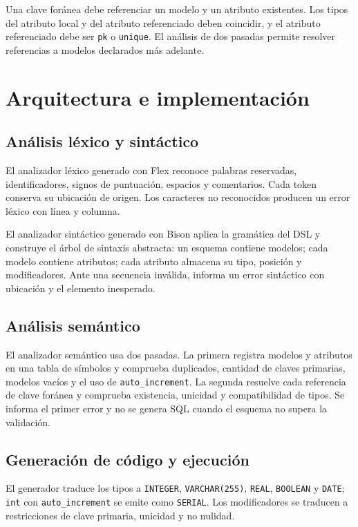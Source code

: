 \documentclass[runningheads]{llncs}
\begin{document}
Una clave foránea debe referenciar un modelo y un atributo existentes. Los tipos
del atributo local y del atributo referenciado deben coincidir, y el atributo
referenciado debe ser \texttt{pk} o \texttt{unique}. El análisis de dos pasadas
permite resolver referencias a modelos declarados más adelante.

\section{Arquitectura e implementación}

\subsection{Análisis léxico y sintáctico}

El analizador léxico generado con Flex reconoce palabras reservadas, identificadores, signos de
puntuación, espacios y comentarios. Cada token conserva su ubicación de origen.
Los caracteres no reconocidos producen un error léxico con línea y columna.

El analizador sintáctico generado con Bison aplica la gramática del DSL y
construye el árbol de sintaxis abstracta: un esquema contiene modelos; cada modelo
contiene atributos; cada atributo almacena su tipo, posición y modificadores.
Ante una secuencia inválida, informa un error sintáctico con ubicación y el
elemento inesperado.

\subsection{Análisis semántico}

El analizador semántico usa dos pasadas. La primera registra modelos y atributos
en una tabla de símbolos y comprueba duplicados, cantidad de claves primarias,
modelos vacíos y el uso de \texttt{auto\_increment}. La segunda resuelve cada
referencia de clave foránea y comprueba existencia, unicidad y compatibilidad
de tipos. Se informa el primer error y no se genera SQL cuando el esquema no
supera la validación.

\subsection{Generación de código y ejecución}

El generador traduce los tipos a \texttt{INTEGER}, \texttt{VARCHAR(255)},
\texttt{REAL}, \texttt{BOOLEAN} y \texttt{DATE}; \texttt{int} con
\texttt{auto\_increment} se emite como \texttt{SERIAL}. Los modificadores se
traducen a restricciones de clave primaria, unicidad y no nulidad.
\end{document}
